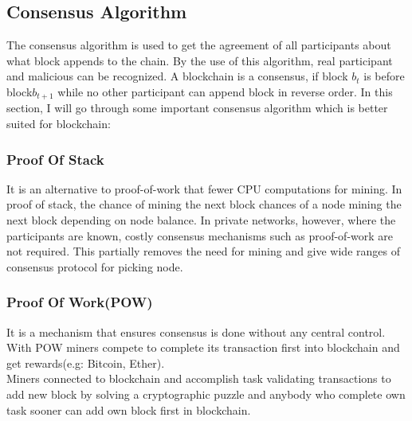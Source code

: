 \subsection{Consensus Algorithm}
The consensus algorithm is used to get the agreement of all participants about what block appends to the chain. By the use of this algorithm, real participant and malicious can be recognized. A blockchain is a consensus, if block $b_t$ is before block$b_{t+1}$  while no other participant can append block in reverse order. In this section, I will go through some important consensus algorithm which is better suited for blockchain\cite{Kevin}:
\subsubsection{Proof Of Stack}
It is an alternative to proof-of-work that fewer CPU computations for mining. In proof of stack, the chance of mining the next block 
chances of a node mining the next block depending on node balance. 
In private networks, however, where the participants are known, costly consensus mechanisms such as proof-of-work are not required. This partially removes the need for mining and give wide ranges of consensus protocol for picking node\cite{Christidis}.

\subsubsection{Proof Of Work(POW)}
It is a mechanism that ensures consensus is done without any central control. With POW miners compete to complete its transaction first into blockchain and get rewards(e.g: Bitcoin, Ether).\\
Miners connected to blockchain and accomplish task validating transactions to add new block by solving a cryptographic puzzle and anybody who complete own task sooner can add own block first in blockchain\cite{Pablo}.

